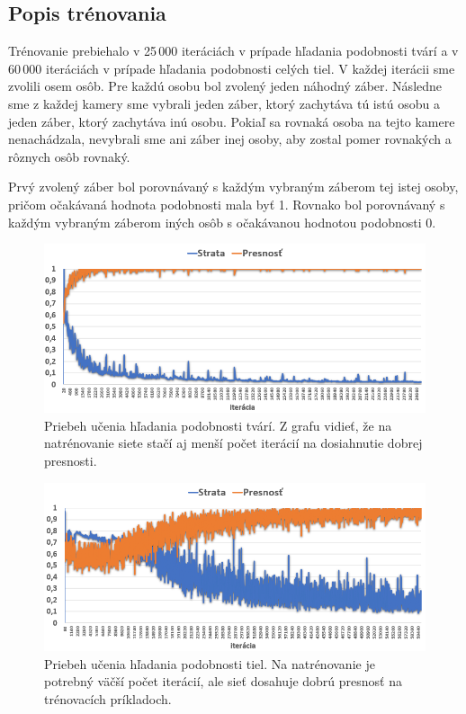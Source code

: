 \subsection{Popis trénovania}
Trénovanie prebiehalo v 25\,000 iteráciách v prípade hľadania podobnosti tvárí a v 60\,000 iteráciách v prípade hľadania podobnosti celých tiel.
V každej iterácii sme zvolili osem osôb.
Pre každú osobu bol zvolený jeden náhodný záber.
Následne sme z každej kamery sme vybrali jeden záber, ktorý zachytáva tú istú osobu a jeden záber, ktorý zachytáva inú osobu.
Pokiaľ sa rovnaká osoba na tejto kamere nenachádzala, nevybrali sme ani záber inej osoby, aby zostal pomer rovnakých a rôznych osôb rovnaký.

Prvý zvolený záber bol porovnávaný s každým vybraným záberom tej istej osoby, pričom očakávaná hodnota podobnosti mala byť 1.
Rovnako bol porovnávaný s každým vybraným záberom iných osôb s očakávanou hodnotou podobnosti 0.

\begin{figure}[H]
\centerline{\includegraphics[width=1\textwidth]{images/graph_learn_face.png}}
\caption[Priebeh učenia hľadania podobnosti tvárí]{Priebeh učenia hľadania podobnosti tvárí. Z grafu vidieť, že na natrénovanie siete stačí aj menší počet iterácií na dosiahnutie dobrej presnosti.}
\label{obr:graph_learn_face}
\end{figure}

\begin{figure}[H]
\centerline{\includegraphics[width=1\textwidth]{images/graph_learn_body.png}}
\caption[Priebeh učenia hľadania podobnosti tiel]{Priebeh učenia hľadania podobnosti tiel. Na natrénovanie je potrebný väčší počet iterácií, ale sieť dosahuje dobrú presnosť na trénovacích príkladoch.}
\label{obr:graph_learn_body}
\end{figure}


